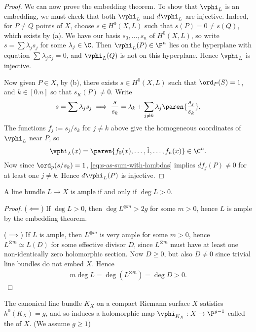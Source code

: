 \documentclass[11pt]{report}
\begin{document}
\begin{proof}
We can now prove the embedding theorem. To show that $\vphi_L$ is an embedding, we must check that both $\vphi_L$ and $d\vphi_L$ are injective. Indeed, for $P \neq Q$ points of $X$, choose $s \in H^0(X,L)$ such that $s(P)=0 \ne s(Q)$, which exists by  (a). We have our basis $s_0,\dots,s_n$ of $H^0(X,L)$, so write $s = \sum \lambda _j s_j$ for some $\lambda _j \in \C$. Then $\vphi_L(P) \in \P^n$ lies on the hyperplane with equation $\sum \lambda _jz_j =0$, and $\vphi_L(Q)$ is not on this hyperplane. Hence $\vphi_L$ is injective.

Now given $P \in X$, by  (b), there exists $s \in H^0(X,L)$ such that $\ord_P(S) = 1$, and $k \in [0.n]$ so that $s_K(P) \ne 0$. Write
\begin{align*}
s = \sum \lambda _js_j \implies \frac{s}{s_k}=\lambda_k +\sum_{j \ne k} \lambda _j \paren{\frac{s_j}{s_k}}. \label{eq:s-as-sum-with-lambdas}
\end{align*}
The functions $f_j := s_j/s_k$ for $j \ne k$ above give the homogeneous coordinates of $\vphi_L$ near $P$, so
\begin{align*}
\vphi_L(x) = \paren{f_0(x),\dots, \hat 1,\dots,f_n(x)} \in \C^n.
\end{align*}
Now since $\ord_p(s/s_k)=1$, \eqref{eq:s-as-sum-with-lambdas} implies $df_j(P)\ne 0$ for at least one $j \ne k$. Hence $d\vphi_L(P)$ is injective.
\end{proof}

\begin{cor}
    A line bundle $L \to X$ is ample if and only if $\deg L >0$.
\end{cor}

\begin{proof}
($\impliedby$) If $\deg L >0$, then $\deg L^{\otimes m}>2g$ for some $m>0$, hence $L$ is ample by the embedding theorem.

($\implies$) If $L$ is ample, then $L^{\otimes m}$ is very ample for some $m>0$, hence $L^{\otimes m}\simeq L(D)$ for some effective divisor $D$, since $L^{\otimes m}$ must have at least one non-identically zero holomorphic section. Now $D \ge 0$, but also $D \ne 0$ since trivial line bundles do not embed $X$. Hence
\begin{align*}
m \deg L = \deg(L^{\otimes m}) = \deg D >0.
\end{align*}
\end{proof}

\begin{rmk}
The canonical line bundle $K_X$ on a compact Riemann surface $X$ satisfies $h^0(K_X)=g$, and so induces a holomorphic map $\vphi_{K_X}:X \to \P^{g-1}$ called the  of $X$. (We assume $g \ge 1$)
\end{rmk}
\end{document}
